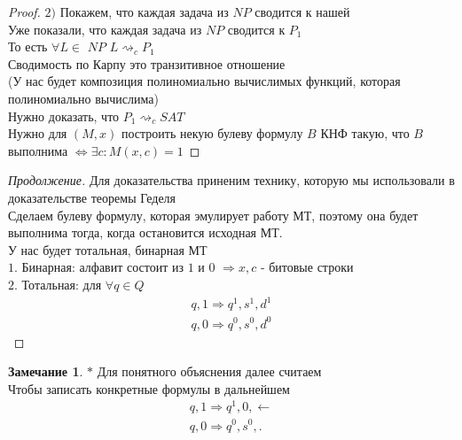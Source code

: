 \documentclass{beamer}
\theoremstyle{plain}
\theoremstyle{definition}
\newtheorem{rmk}[thm]{Замечание}
\begin{document}
\begin{frame}
	\begin{proof}
		$2)$ Покажем, что каждая задача из $NP$ сводится к нашей \\
		Уже показали, что каждая задача из $NP$ сводится к $P_1$ \\
		То есть $\forall L \in$ $NP$ $L \rightsquigarrow_c P_1$ \\
		Сводимость по Карпу это транзитивное отношение \\
		(У нас будет композиция полиномиально вычислимых функций, которая полиномиально вычислима) \\
		Нужно доказать, что $P_1 \rightsquigarrow_c SAT$ \\
		Нужно для $(M,x)$ построить некую булеву формулу $B$ КНФ такую, что $B$ выполнима $\Leftrightarrow \exists c:M(x,c)=1$
	\end{proof}
\end{frame}

\begin{frame}
	\begin{proof}[Продолжение]
		Для доказательства приненим технику, которую мы использовали в доказательстве теоремы Геделя \\
		Сделаем булеву формулу, которая эмулирует работу МТ, поэтому она будет выполнима тогда, когда остановится исходная МТ. \\
		У нас будет тотальная, бинарная МТ \\
		$1.$ Бинарная: алфавит состоит из $1$ и $0$ $\Rightarrow x,c$ - битовые строки\\
		$2.$ Тотальная: для $\forall q \in Q$
		\begin{equation}
	    	\begin{split}
	    		q, 1 \Rightarrow q^1,s^1,d^1 \\
	    		q, 0 \Rightarrow q^0,s^0,d^0
	    	\end{split}
	    \end{equation}
	\end{proof}
\end{frame}

\begin{frame}
	\begin{rmk}
	    $*$ Для понятного объяснения далее считаем \\
	    Чтобы записать конкретные формулы в дальнейшем
	    \begin{equation*}
	    	\begin{split}
	    		q, 1 \Rightarrow q^1,0,\leftarrow \\
	    		q, 0 \Rightarrow q^0,s^0,.
	    	\end{split}
	    \end{equation*} \\
	\end{rmk}
\end{frame}
\end{document}
